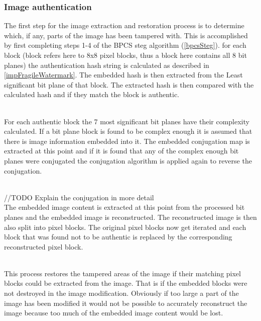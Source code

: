 \documentclass[11pt]{article}
\begin{document}
\subsubsection{Image authentication}
The first step for the image extraction and restoration process is to determine which, if any, parts of the image has been tampered with.
This is accomplished by first completing steps 1-4 of the BPCS steg algorithm (\ref{bpcsSteg}).
for each block (block refers here to 8x8 pixel blocks, thus a block here contains all 8 bit planes) the authentication hash string is calculated as described in \ref{impFragileWatermark}. 
The embedded hash is then extracted from the Least significant bit plane of that block.
The extracted hash is then compared with the calculated hash and if they match the block is authentic.

\hspace{0pt} \\
For each authentic block the 7 most significant bit planes have their complexity calculated.
If a bit plane block is found to be complex enough it is assumed that there is image information embedded into it.
The embedded conjugation map is extracted at this point and if it is found that any of the complex enough bit planes were conjugated the conjugation algorithm is applied again to reverse the conjugation.

\hspace{0pt} \\
//TODO Explain the conjugation in more detail
\hspace{0pt} \\

The embedded image content is extracted at this point from the processed bit planes and the embedded image is reconstructed.
The reconstructed image is then also split into pixel blocks.
The original pixel blocks now get iterated and each block that was found not to be authentic is replaced by the corresponding reconstructed pixel block. 

\hspace{0pt} \\
This process restores the tampered areas of the image if their matching pixel blocks could be extracted from the image. That is if the embedded blocks were not destroyed in the image modification. Obviously if too large a part of the image has been modified it would not be possible to accurately reconstruct the image because too much of the embedded image content would be lost. 






\end{document}
